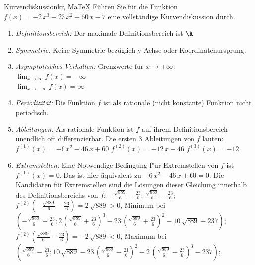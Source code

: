  \providecommand{\MoIl}{(} 
 \providecommand{\MoIr}{)}
 \providecommand{\MIntvlSep}{;} 
 \providecommand{\MElSetSep}{;} 
 \begin{MAufgabe}{Kurvendiskussion}{kr, MaTeX}
 F\"uhren Sie f\"ur die Funktion $f(x)= - 2\, x^3 - 23\, x^2 + 60\, x - 7$ eine vollst\"andige Kurvendiskussion durch.\\ 
 \ifLsg\Loesung
 \begin{enumerate}
 \item \emph{Definitionsbereich:} 
 Der maximale Definitionsbereich ist $\R$\item \emph{Symmetrie:} 
 Keine Symmetrie bez\"uglich y-Achse oder Koordinatenursprung.\item \emph{Asymptotisches Verhalten:} 
 Grenzwerte f\"ur $x\rightarrow \pm \infty$: \\ 
 $\lim_{x\rightarrow \infty} f(x)=- \infty$ \\ 
 $\lim_{x\rightarrow -\infty} f(x)=\infty$ \\ 
 \item \emph{Periodizit\"at:} 
 Die Funktion $f$ ist als rationale (nicht konstante) Funktion nicht periodisch.\item \emph{Ableitungen:} 
 Als rationale Funktion ist $f$ auf ihrem Definitionsbereich unendlich oft differenzierbar. 
 Die ersten 3 Ableitungen von $f$ lauten: \\ 
 $f^{(1)}(x)= - 6\, x^2 - 46\, x + 60$\newline 
  $f^{(2)}(x)= - 12\, x - 46$\newline 
  $f^{(3)}(x)=-12$\newline 
  \item \emph{Extremstellen:} 
 Eine Notwendige Bedingung f"ur Extremstellen von $f$ ist $f^{(1)}(x)=0$. 
 Das ist hier \"aquivalent zu $ - 6\, x^2 - 46\, x + 60=0$. 
 Die Kandidaten f\"ur Extremstellen sind die L\"osungen dieser Gleichung innerhalb des Definitionsbereichs von $f$: $ - \frac{\sqrt{889}}{6} - \frac{23}{6}$; $\frac{\sqrt{889}}{6} - \frac{23}{6}$; \\ 
 $f^{(2)}( - \frac{\sqrt{889}}{6} - \frac{23}{6})=2\, \sqrt{889}$$>0$, Minimum bei $( - \frac{\sqrt{889}}{6} - \frac{23}{6};2\, {\left(\frac{\sqrt{889}}{6} + \frac{23}{6}\right)}^3 - 23\, {\left(\frac{\sqrt{889}}{6} + \frac{23}{6}\right)}^2 - 10\, \sqrt{889} - 237)$; \\ 
 $f^{(2)}(\frac{\sqrt{889}}{6} - \frac{23}{6})=- 2\, \sqrt{889}$$<0$, Maximum bei $(\frac{\sqrt{889}}{6} - \frac{23}{6};10\, \sqrt{889} - 23\, {\left(\frac{\sqrt{889}}{6} - \frac{23}{6}\right)}^2 - 2\, {\left(\frac{\sqrt{889}}{6} - \frac{23}{6}\right)}^3 - 237)$; \\ 

\end{enumerate}
\end{MAufgabe}
